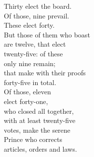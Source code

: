 \begin{paracol}{2}
	\begin{leftcolumn}
		\centering
		\textit{}
	\end{leftcolumn}
	
	\begin{rightcolumn}
		\centering
			Thirty elect the board. \\ 
			Of those, nine prevail. \\
			These elect forty.\\
			But those of them who boast \\
			are twelve, that elect \\
			twenty-five: of these \\
			only nine remain; \\
			that make with their proofs \\
			forty-five in total. \\
			Of those, eleven \\
			elect forty-one, \\
			who closed all together, \\
			with at least twenty-five \\
			votes, make the serene \\
			Prince who corrects \\
			articles, orders and laws. \\
	\end{rightcolumn}
\end{paracol}
\vspace{1em}

